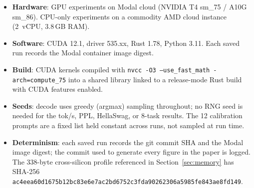 \documentclass{article}
\begin{document}
\begin{itemize}[leftmargin=*, itemsep=2pt]
\item \textbf{Hardware}: GPU experiments on Modal cloud (NVIDIA T4 sm\_75 /
  A10G sm\_86). CPU-only experiments on a commodity AMD cloud instance
  (2~vCPU, 3.8\,GB RAM).
\item \textbf{Software}: CUDA 12.1, driver 535.xx, Rust 1.78, Python 3.11.
  Each saved run records the Modal container image digest.
\item \textbf{Build}: CUDA kernels compiled with
  \texttt{nvcc -O3 --use\_fast\_math -arch=compute\_75} into a shared library
  linked to a release-mode Rust build with CUDA features enabled.
\item \textbf{Seeds}: decode uses greedy (argmax) sampling throughout; no RNG
  seed is needed for the tok/s, PPL, HellaSwag, or 8-task results. The 12
  calibration prompts are a fixed list held constant across runs, not sampled
  at run time.
\item \textbf{Determinism}: each saved run records the git commit SHA and
  the Modal image digest; the commit used to generate every figure in the
  paper is logged. The 338-byte cross-silicon profile referenced in
  Section~\ref{sec:memory} has SHA-256\\
  {\scriptsize\texttt{ac4eea60d1675b12bc83e6e7ac2bd6\allowbreak 752c3fda90262306a5985fe843ae8fd149}}.
\end{itemize}
\end{document}
